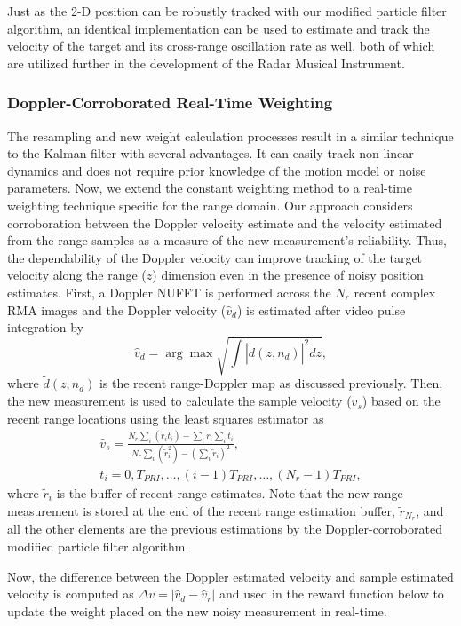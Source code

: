 \documentclass[10pt,journal,final]{IEEEtran}
\begin{document}
Just as the 2-D position can be robustly tracked with our modified particle filter algorithm, an identical implementation can be used to estimate and track the velocity of the target and its cross-range oscillation rate as well, both of which are utilized further in the development of the Radar Musical Instrument.

\subsubsection{Doppler-Corroborated Real-Time Weighting}
The resampling and new weight calculation processes result in a similar technique to the Kalman filter with several advantages. It can easily track non-linear dynamics and does not require prior knowledge of the motion model or noise parameters. Now, we extend the constant weighting method to a real-time weighting technique specific for the range domain.
Our approach considers corroboration between the Doppler velocity estimate and the velocity estimated from the range samples as a measure of the new measurement's reliability. Thus, the dependability of the Doppler velocity can improve tracking of the target velocity along the range ($z$) dimension even in the presence of noisy position estimates. First, a Doppler NUFFT is performed across the $N_r$ recent complex RMA images and the Doppler velocity ($\hat{v}_d$) is estimated after video pulse integration by
\begin{equation}
	\label{eq:velocity_doppler}
	\hat{v}_d = \arg \max \sqrt{\int |\tilde{d}(z,n_d)|^2 dz},
\end{equation}
where $\tilde{d}(z,n_d)$ is the recent range-Doppler map as discussed previously. Then, the new measurement is used to calculate the sample velocity ($\hat{v}_s$) based on the recent range locations using the least squares estimator as
\begin{gather}
	\hat{v}_s = \frac{N_r \sum_i (\tilde{r}_i t_i) - \sum_i \tilde{r}_i \sum_i t_i}{N_r \sum_i (\tilde{r}_i^2) - \left( \sum_i \tilde{r}_i \right)^2}, \\
	t_i = 0, T_{PRI}, \dots , (i - 1)T_{PRI}, \dots , (N_r - 1)T_{PRI},
\end{gather}
where $\tilde{r}_i$ is the buffer of recent range estimates. Note that the new range measurement is stored at the end of the recent range estimation buffer, $\tilde{r}_{N_r}$, and all the other elements are the previous estimations by the Doppler-corroborated modified particle filter algorithm.

Now, the difference between the Doppler estimated velocity and sample estimated velocity is computed as $\Delta v = |\hat{v}_d - \hat{v}_r|$ and used in the reward function below to update the weight placed on the new noisy measurement in real-time. 
\end{document}
